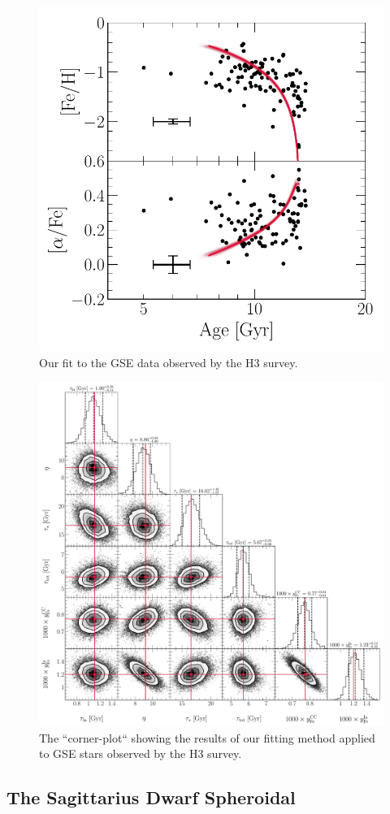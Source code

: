 \documentclass[ms.tex]{subfiles}
\begin{document}
\begin{figure}
\includegraphics[scale = 0.42]{gsefit_amr.pdf}
\caption{Our fit to the GSE data observed by the H3 survey.}
\label{fig:gse_bestfit}
\end{figure}

\begin{figure}
\includegraphics[scale = 0.45]{gsechem_102k4.pdf}
\caption{The ``corner-plot`` showing the results of our fitting method
applied to GSE stars observed by the H3 survey.}
\label{fig:gse_corner}
\end{figure}

\subsection{The Sagittarius Dwarf Spheroidal}
\label{sec:h3:sgr}
\end{document}
